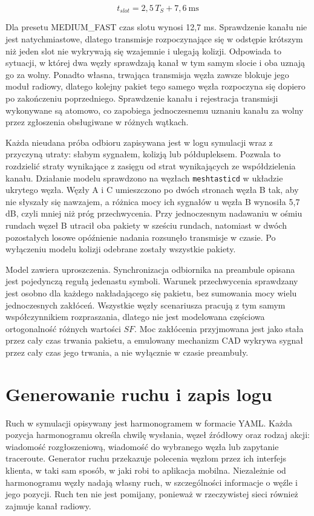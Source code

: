 \begin{equation}\label{eq:slot}
t_{slot} = 2{,}5\,T_S + 7{,}6~\textrm{ms}
\end{equation}

Dla presetu MEDIUM\_FAST czas slotu wynosi 12,7 ms. Sprawdzenie kanału nie jest natychmiastowe, dlatego transmisje rozpoczynające się w odstępie krótszym niż jeden slot nie wykrywają się wzajemnie i ulegają kolizji. Odpowiada to sytuacji, w której dwa węzły sprawdzają kanał w tym samym slocie i oba uznają go za wolny. Ponadto własna, trwająca transmisja węzła zawsze blokuje jego moduł radiowy, dlatego kolejny pakiet tego samego węzła rozpoczyna się dopiero po zakończeniu poprzedniego. Sprawdzenie kanału i rejestracja transmisji wykonywane są atomowo, co zapobiega jednoczesnemu uznaniu kanału za wolny przez zgłoszenia obsługiwane w różnych wątkach.

Każda nieudana próba odbioru zapisywana jest w logu symulacji wraz z przyczyną utraty: słabym sygnałem, kolizją lub półdupleksem. Pozwala to rozdzielić straty wynikające z zasięgu od strat wynikających ze współdzielenia kanału. Działanie modelu sprawdzono na węzłach \texttt{meshtasticd} w układzie ukrytego węzła. Węzły A i C umieszczono po dwóch stronach węzła B tak, aby nie słyszały się nawzajem, a różnica mocy ich sygnałów u węzła B wynosiła 5,7 dB, czyli mniej niż próg przechwycenia. Przy jednoczesnym nadawaniu w ośmiu rundach węzeł B utracił oba pakiety w sześciu rundach, natomiast w dwóch pozostałych losowe opóźnienie nadania rozsunęło transmisje w czasie. Po wyłączeniu modelu kolizji odebrane zostały wszystkie pakiety.

Model zawiera uproszczenia. Synchronizacja odbiornika na preambule opisana jest pojedynczą regułą jedenastu symboli. Warunek przechwycenia sprawdzany jest osobno dla każdego nakładającego się pakietu, bez sumowania mocy wielu jednoczesnych zakłóceń. Wszystkie węzły scenariusza pracują z tym samym współczynnikiem rozpraszania, dlatego nie jest modelowana częściowa ortogonalność różnych wartości \(SF\). Moc zakłócenia przyjmowana jest jako stała przez cały czas trwania pakietu, a emulowany mechanizm CAD wykrywa sygnał przez cały czas jego trwania, a nie wyłącznie w czasie preambuły.

\section{Generowanie ruchu i zapis logu}

Ruch w symulacji opisywany jest harmonogramem w formacie YAML. Każda pozycja harmonogramu określa chwilę wysłania, węzeł źródłowy oraz rodzaj akcji: wiadomość rozgłoszeniową, wiadomość do wybranego węzła lub zapytanie traceroute. Generator ruchu przekazuje polecenia węzłom przez ich interfejs klienta, w taki sam sposób, w jaki robi to aplikacja mobilna. Niezależnie od harmonogramu węzły nadają własny ruch, w szczególności informacje o węźle i jego pozycji. Ruch ten nie jest pomijany, ponieważ w rzeczywistej sieci również zajmuje kanał radiowy.

